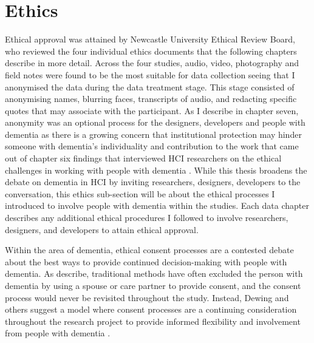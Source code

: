 \section{Ethics}
\label{Method:Ethics}
Ethical approval was attained by Newcastle University Ethical Review Board, who reviewed the four individual ethics documents that the following chapters describe in more detail. Across the four studies, audio, video, photography and field notes were found to be the most suitable for data collection seeing that I anonymised the data during the data treatment stage. This stage consisted of anonymising names, blurring faces, transcripts of audio, and redacting specific quotes that may associate with the participant. As I describe in chapter seven, anonymity was an optional process for the designers, developers and people with dementia as there is a growing concern that institutional protection may hinder someone with dementia's individuality and contribution to the work that came out of chapter six findings that interviewed HCI researchers on the ethical challenges in working with people with dementia \citep{hodge_relational_2020}. While this thesis broadens the debate on dementia in HCI by inviting researchers, designers, developers to the conversation, this ethics sub-section will be about the ethical processes I introduced to involve people with dementia within the studies. Each data chapter describes any additional ethical procedures I followed to involve researchers, designers, and developers to attain ethical approval.

Within the area of dementia, ethical consent processes are a contested debate about the best ways to provide continued decision-making with people with dementia. As \cite{dewing_participatory_2007} describe, traditional methods have often excluded the person with dementia by using a spouse or care partner to provide consent, and the consent process would never be revisited throughout the study. Instead, Dewing and others suggest a model where consent processes are a continuing consideration throughout the research project to provide informed flexibility and involvement from people with dementia \citep{dewing_participatory_2007,slaughter2007consent,mckeown_actively_2009}. 

